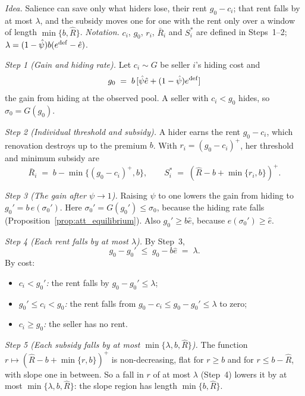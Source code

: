 \upshape
\emph{Idea.} Salience can save only what hiders lose, their rent $g_0-c_i$; that rent falls by at most $\lambda$, and the subsidy moves one for one with the rent only over a window of length $\min\{b,\hat R\}$. \emph{Notation.} $c_i$, $g_0$, $r_i$, $\bar R_i$ and $S_i^*$ are defined in Steps~1--2; $\lambda=(1-\hat\psi)b(e^{\rm def}-\hat e)$.

\emph{Step 1 (Gain and hiding rate).} Let $c_i\sim G$ be seller $i$'s hiding cost and
\begin{equation*}
    g_0\;=\;b\,[\hat\psi\hat e+(1-\hat\psi)e^{\rm def}]
\end{equation*}
the gain from hiding at the observed pool. A seller with $c_i<g_0$ hides, so $\hat\sigma_0=G(g_0)$.

\emph{Step 2 (Individual threshold and subsidy).} A hider earns the rent $g_0-c_i$, which renovation destroys up to the premium $b$. With $r_i=(g_0-c_i)^+$, her threshold and minimum subsidy are
\begin{equation*}
    \bar R_i\;=\;b-\min\{(g_0-c_i)^+,b\},\qquad S_i^*\;=\;(\hat R-b+\min\{r_i,b\})^+.
\end{equation*}

\emph{Step 3 (The gain after $\psi\to1$).} Raising $\psi$ to one lowers the gain from hiding to $g_0'=b\,e(\sigma_0')$. Here $\sigma_0'=G(g_0')\le\hat\sigma_0$, because the hiding rate falls (Proposition~\ref{prop:att_equilibrium}). Also $g_0'\ge b\hat e$, because $e(\sigma_0')\ge\hat e$.

\emph{Step 4 (Each rent falls by at most $\lambda$).} By Step~3,
\begin{equation*}
    g_0-g_0'\;\le\;g_0-b\hat e\;=\;\lambda.
\end{equation*}
By cost:
\begin{itemize}
    \item \emph{$c_i<g_0'$:} the rent falls by $g_0-g_0'\le\lambda$;
    \item \emph{$g_0'\le c_i<g_0$:} the rent falls from $g_0-c_i\le g_0-g_0'\le\lambda$ to zero;
    \item \emph{$c_i\ge g_0$:} the seller has no rent.
\end{itemize}

\emph{Step 5 (Each subsidy falls by at most $\min\{\lambda,b,\hat R\}$).} The function $r\mapsto(\hat R-b+\min\{r,b\})^+$ is non-decreasing, flat for $r\ge b$ and for $r\le b-\hat R$, with slope one in between. So a fall in $r$ of at most $\lambda$ (Step~4) lowers it by at most $\min\{\lambda,b,\hat R\}$: the slope region has length $\min\{b,\hat R\}$.

